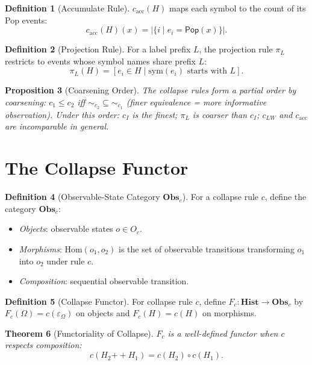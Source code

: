 \documentclass[12pt, a4paper, openany]{book}
\theoremstyle{plain}
\newtheorem{theorem}{Theorem}[chapter]
\newtheorem{proposition}[theorem]{Proposition}
\theoremstyle{definition}
\newtheorem{definition}[theorem]{Definition}
\theoremstyle{remark}
\newcommand{\Pop}{\mathsf{Pop}}
\newcommand{\Hist}{\mathbf{Hist}}
\newcommand{\Obs}{\mathbf{Obs}}
\begin{document}
\begin{definition}[Accumulate Rule]
$c_{\mathrm{acc}}(H)$ maps each symbol to the count of its Pop events:
\[
c_{\mathrm{acc}}(H)(x) = |\{i \mid e_i = \Pop(x)\}|.
\]
\end{definition}

\begin{definition}[Projection Rule]
For a label prefix $L$, the projection rule $\pi_L$ restricts to events whose
symbol names share prefix $L$:
\[
\pi_L(H) = [e_i \in H \mid \mathrm{sym}(e_i) \text{ starts with } L].
\]
\end{definition}

\begin{proposition}[Coarsening Order]
The collapse rules form a partial order by coarsening: $c_1 \leq c_2$ iff
${\sim_{c_2}} \subseteq {\sim_{c_1}}$ (finer equivalence = more informative
observation). Under this order: $c_I$ is the finest; $\pi_L$ is coarser than
$c_I$; $c_{LW}$ and $c_{\mathrm{acc}}$ are incomparable in general.
\end{proposition}

\section{The Collapse Functor}

\begin{definition}[Observable-State Category $\Obs_c$]
For a collapse rule $c$, define the category $\Obs_c$:
\begin{itemize}
\item \textit{Objects}: observable states $o \in O_c$.
\item \textit{Morphisms}: $\mathrm{Hom}(o_1, o_2)$ is the set of observable
transitions transforming $o_1$ into $o_2$ under rule $c$.
\item \textit{Composition}: sequential observable transition.
\end{itemize}
\end{definition}

\begin{definition}[Collapse Functor]
For collapse rule $c$, define $F_c : \Hist \to \Obs_c$ by
$F_c(\Omega) = c(\varepsilon_\Omega)$ on objects and $F_c(H) = c(H)$ on morphisms.
\end{definition}

\begin{theorem}[Functoriality of Collapse]
$F_c$ is a well-defined functor when $c$ respects composition:
\[
c(H_2 \mathbin{++} H_1) = c(H_2) \circ c(H_1).
\]
\end{theorem}
\end{document}
